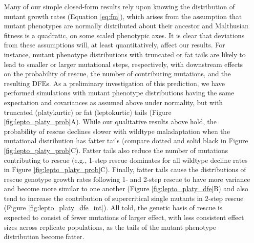 \documentclass[9pt,twocolumn,twoside,lineno]{gsajnl}
\begin{document}
Many of our simple closed-form results rely upon knowing the distribution of mutant growth rates (Equation \ref{eq:fm}), which arises from the assumption that mutant phenotypes are normally distributed about their ancestor and Malthusian fitness is a quadratic, on some scaled phenotypic axes.
It is clear that deviations from these assumptions will, at least quantitatively, affect our results.
For instance, mutant phenotype distributions with truncated or fat tails are likely to lead to smaller or larger mutational steps, respectively, with downstream effects on the probability of rescue, the number of contributing mutations, and the resulting DFEs. 
As a preliminary investigation of this prediction, we have performed simulations with mutant phenotype distributions having the same expectation and covariances as assumed above under normality, but with truncated (platykurtic) or fat (leptokurtic) tails (Figure \ref{fig:lepto_platy_prob}A).
While our qualitative results above hold, the probability of rescue declines slower with wildtype maladaptation when the mutational distribution has fatter tails (compare dotted and solid black in Figure \ref{fig:lepto_platy_prob}C).
Fatter tails also reduce the number of mutations contributing to rescue (e.g., 1-step rescue dominates for all wildtype decline rates in Figure \ref{fig:lepto_platy_prob}C).
Finally, fatter tails cause the distributions of rescue genotype growth rates following 1- and 2-step rescue to have more variance and become more similar to one another (Figure \ref{fig:lepto_platy_dfe}B) and also tend to increase the contribution of supercritical single mutants in 2-step rescue (Figure \ref{fig:lepto_platy_dfe_int}).
All told, the genetic basis of rescue is expected to consist of fewer mutations of larger effect, with less consistent effect sizes across replicate populations, as the tails of the mutant phenotype distribution become fatter.
\end{document}
